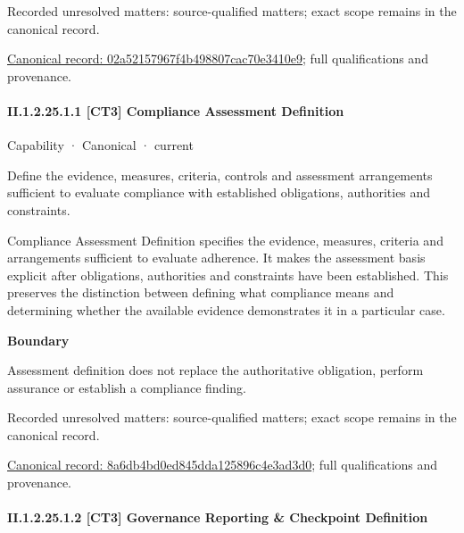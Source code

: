 {\small Recorded unresolved matters: source-qualified matters; exact scope remains in the canonical record.}\par
{\footnotesize \href{../../../../continuum/strategy/capability/02a52157967f4b498807cac70e3410e9.md}{Canonical record: 02a52157967f4b498807cac70e3410e9}; full qualifications and provenance.}\par
\paragraph*{II.1.2.25.1.1 [CT3] Compliance Assessment Definition}
\label{navigation:II.1.2.25.1.1}

\label{element:8a6db4bd0ed845dda125896c4e3ad3d0}
{\small Capability · Canonical · current}\par

Define the evidence, measures, criteria, controls and assessment arrangements sufficient to evaluate compliance with established obligations, authorities and constraints.



Compliance Assessment Definition specifies the evidence, measures, criteria and arrangements sufficient to evaluate adherence. It makes the assessment basis explicit after obligations, authorities and constraints have been established. This preserves the distinction between defining what compliance means and determining whether the available evidence demonstrates it in a particular case.



\textbf{Boundary}



Assessment definition does not replace the authoritative obligation, perform assurance or establish a compliance finding.


{\small Recorded unresolved matters: source-qualified matters; exact scope remains in the canonical record.}\par
{\footnotesize \href{../../../../continuum/strategy/capability/8a6db4bd0ed845dda125896c4e3ad3d0.md}{Canonical record: 8a6db4bd0ed845dda125896c4e3ad3d0}; full qualifications and provenance.}\par
\paragraph*{II.1.2.25.1.2 [CT3] Governance Reporting \& Checkpoint Definition}
\label{navigation:II.1.2.25.1.2}

